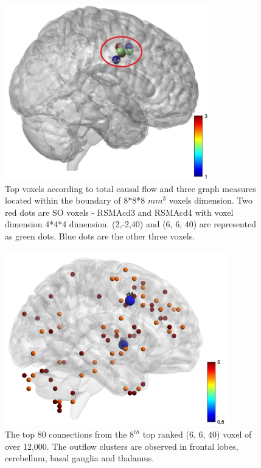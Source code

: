\begin{figure}
\centerline{
	\includegraphics[height =3in]{Plots/top_voxels.jpg}
	}
	\caption{ Top voxels according to total causal flow and three graph measures located within the boundary of 8*8*8 $mm^3$ voxels dimension. Two red dots are SO voxels - RSMAcd3 and RSMAcd4 with voxel dimension 4*4*4 dimension. (2,-2,40) and (6, 6, 40) are represented as green dots. Blue dots are the other three voxels.
	\label{fig:top_voxels}
}
\end{figure}

\begin{figure}
\centerline{
	\includegraphics[height =3in]{Plots/Patient_C_eegfmri_voxel_cluster.jpg}
	}
	\caption{ The top 80 connections from the $8^{th}$ top ranked (6, 6, 40) voxel of over 12,000. The outflow clusters are observed in frontal lobes, cerebellum, basal ganglia and thalamus.
	\label{fig:top_voxel_cluster}
}
\end{figure}


